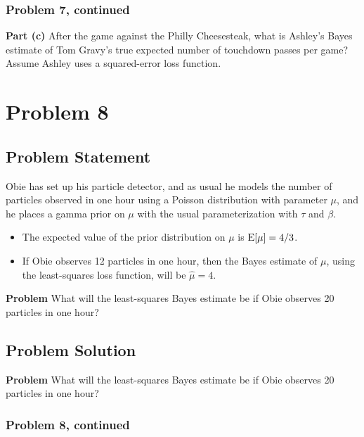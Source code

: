 \documentclass[12pt]{article}
\theoremstyle{definition}
\begin{document}
\newpage
\subsubsection*{Problem 7, continued}

\vspace{4.5in}
\noindent
{\bf Part (c)} After the game against the Philly Cheesesteak, what is Ashley's Bayes estimate of Tom Gravy's true expected number of touchdown passes per game? Assume Ashley uses a squared-error loss function.




\newpage
\section*{Problem 8}

\subsection*{Problem Statement}

Obie has set up his particle detector, and as usual he models the number of particles observed in one hour using a Poisson distribution with parameter $\mu$, and he places a gamma prior on $\mu$ with the usual parameterization with $\tau$ and $\beta$.
\begin{itemize}
	\item The expected value of the prior distribution on $\mu$ is $\hbox{E}[\mu] = 4/3$.
	\item If Obie observes 12 particles in one hour, then the Bayes estimate of $\mu$, using the least-squares loss function, will be $\hat{\mu} = 4$.
\end{itemize}

\bigskip
\noindent
{\bf Problem} What will the least-squares Bayes estimate be if Obie observes 20 particles in one hour?



\subsection*{Problem Solution}

\noindent
{\bf Problem} What will the least-squares Bayes estimate be if Obie observes 20 particles in one hour?

\newpage
\subsubsection*{Problem 8, continued}
\end{document}
